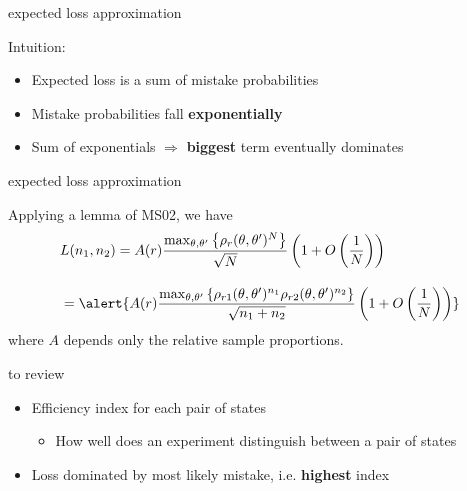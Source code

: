 \documentclass[square,]{gBakerBeamer}
\renewcommand{\|}{\,|\,}
\begin{document}
\begin{frame}{expected loss approximation}

  Intuition:

  \begin{itemize}
    \item<1-> Expected loss is a sum of mistake probabilities
    \item<2-> Mistake probabilities fall \textbf{exponentially}
    \item<3-> \alert<3>{Sum of exponentials $\Rightarrow$ \textbf{biggest} term eventually dominates}
  \end{itemize}



  \note{%

  }
\end{frame}


\begin{frame}{expected loss approximation}

  Applying a lemma of MS02, we have
  \begin{align*}
    &L(n_1,n_2) = A(r){\textstyle \max_{\theta,\theta'}\left\{ \rho_r(\theta,\theta')^N \right\}
      \over \sqrt{N}}
      \left( 1 + O \left( 1 \over N \right) \right)\\[1em]
    &= \alert{
      A(r){\textstyle \max_{\theta,\theta'}\left\{ \rho_{r1}(\theta,\theta')^{n_1}\rho_{r2}(\theta,\theta')^{n_2} \right\}
      \over \sqrt{n_1+n_2}}
      \left( 1 + O \left( 1 \over N\right) \right)}
  \end{align*}
  where $A$ depends only the relative sample proportions.

  \note{%

  }
\end{frame}


\begin{frame}{to review}

  \begin{itemize}
    \item Efficiency index for each pair of states
          \begin{itemize}
            \item How well does an experiment distinguish between a pair of states
          \end{itemize}\bigskip
    \item<2-> Loss dominated by most likely mistake, i.e. \textbf{highest} index
  \end{itemize}
  \note{%

  }
\end{frame}
\end{document}

